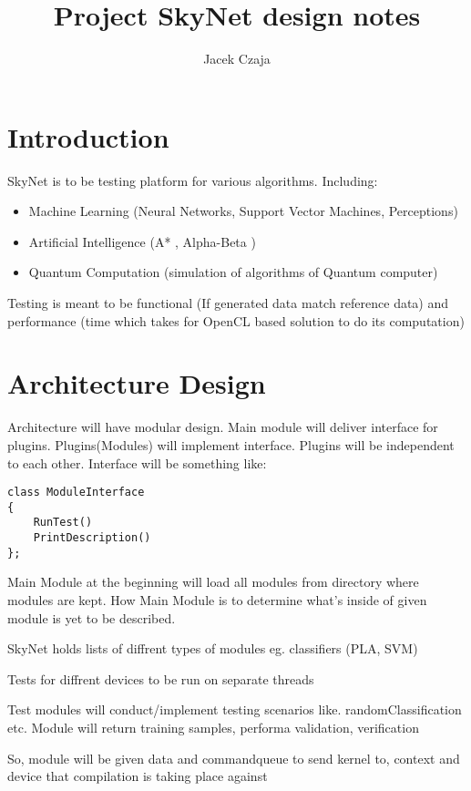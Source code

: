 \documentclass[a4paper,10pt]{article}
\title{Project SkyNet design notes}
\author{Jacek Czaja}
\begin{document}
\maketitle

\tableofcontents

\section{Introduction}
SkyNet is to be testing platform for various algorithms. Including:
\begin{itemize}
\item Machine Learning (Neural Networks, Support Vector Machines, Perceptions)
\item Artificial Intelligence (A* , Alpha-Beta )
\item Quantum Computation (simulation of algorithms of Quantum computer)
\end{itemize}

Testing is meant to be functional (If generated data match reference data) and performance (time which takes for OpenCL based solution to do its computation)

\section{Architecture Design}
Architecture will have modular design.
Main module will deliver interface for plugins.
Plugins(Modules) will implement interface.
Plugins will be independent to each other.
Interface will be something like:
\begin{verbatim}
class ModuleInterface
{
    RunTest()
    PrintDescription()
};
\end{verbatim}

Main Module at the beginning will load all modules from directory where modules are kept.
How Main Module is to determine what's inside of given module is  yet to be described.

SkyNet holds lists of diffrent types of modules eg. classifiers (PLA, SVM)

Tests for diffrent devices to be run on separate threads

Test modules will conduct/implement testing scenarios like. randomClassification etc. Module will return training samples,
performa validation, verification 

So, module will be given data and commandqueue to send kernel to, context and device that compilation is taking place against
\end{document}
